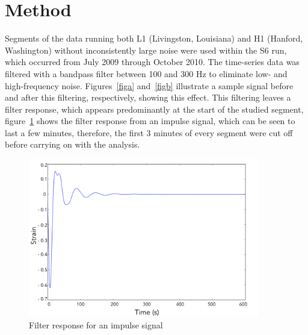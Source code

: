 \section{Method}

Segments of the data running both L1 (Livingston, Louisiana) and H1 (Hanford, Washington) without inconsistently large noise were used within the S6 run, which occurred from July 2009 through October 2010. The time-series data was filtered with a bandpass filter between 100 and 300 Hz to eliminate low- and high-frequency noise. Figures~\ref{figa} and~\ref{figb} illustrate a sample signal before and after this filtering, respectively, showing this effect. This filtering leaves a filter response, which appears predominantly at the start of the studied segment, figure~\ref{impulse} shows the filter response from an impulse signal, which can be seen to last a few minutes, therefore, the first 3 minutes of every segment were cut off before carrying on with the analysis.

\begin{figure}[htb]
\begin{center}
\includegraphics[width=0.9\textwidth]{impulse}
\caption{Filter response for an impulse signal}
\label{impulse}
\end{center}
\end{figure}

